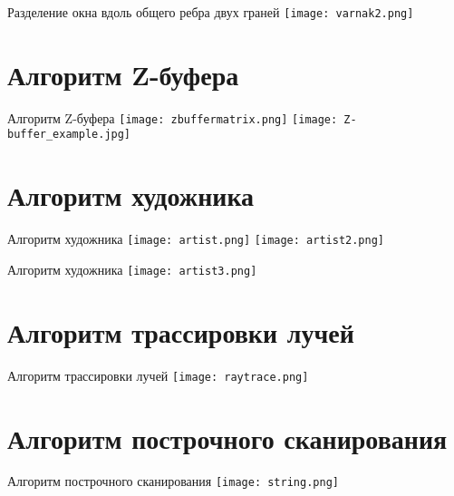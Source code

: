 \documentclass[10pt]{beamer}
\begin{document}
	\begin{frame}{Разделение окна вдоль общего ребра двух граней}
		\centering%
		\texttt{[image: varnak2.png]}	
	\end{frame}
	
	\section{Алгоритм Z-буфера}
	
	\begin{frame}{Алгоритм Z-буфера}
		{
			\centering\texttt{[image: zbuffermatrix.png]}
		}
		{
			\centering\texttt{[image: Z-buffer\_example.jpg]}
		}
	\end{frame}
	
	\section{Алгоритм художника}
	
	\begin{frame}{Алгоритм художника}
		{\centering\texttt{[image: artist.png]}}		
		{\centering\texttt{[image: artist2.png]}}
		
	\end{frame}
	
	
		\begin{frame}{Алгоритм художника}
	\centering\texttt{[image: artist3.png]}		
	
		
	\end{frame}
	
	\section{Алгоритм трассировки лучей}
	
	\begin{frame}{Алгоритм трассировки лучей}
		\centering\texttt{[image: raytrace.png]}		
		
		
	\end{frame}
	
	\section{Алгоритм построчного сканирования}
	
	\begin{frame}{Алгоритм построчного сканирования}
		\centering\texttt{[image: string.png]}			
		
	\end{frame}
	
\end{document}

